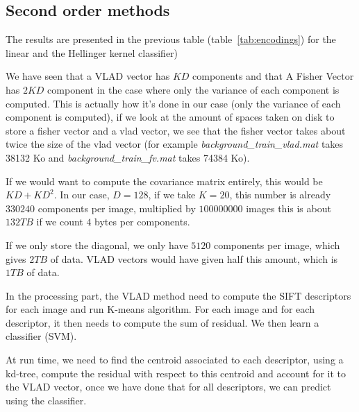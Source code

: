 \documentclass{article}
\begin{document}
\subsection{Second order methods}


The results are presented in the previous table
(table~\ref{tab:encodings}) for the linear and the Hellinger kernel
classifier)


We have seen that a VLAD vector has $K D$ components and that A Fisher
Vector has $2 K D$ component in the case where only the variance of
each component is computed. This is actually how it's done in our case
(only the variance of each component is computed), if we look at the
amount of spaces taken on disk to store a fisher vector and a vlad
vector, we see that the fisher vector takes about twice the size of
the vlad vector (for example \emph{background\_train\_vlad.mat} takes
38132 Ko and \emph{background\_train\_fv.mat} takes 74384 Ko).

If we would want to compute the covariance matrix entirely, this would
be $K D + K D^2$. In our case, $D = 128$, if we take $K = 20$, this
number is already $330240$ components per image, multiplied by
$100 000 000$ images this is about $132TB$ if we count $4$ bytes per
components.

If we only store the diagonal, we only have $5120$ components per
image, which gives $2TB$ of data. VLAD vectors would have given half
this amount, which is $1TB$ of data.

In the processing part, the VLAD method need to compute the SIFT
descriptors for each image and run K-means algorithm. For each image
and for each descriptor, it then needs to compute the sum of
residual. We then learn a classifier (SVM).

At run time, we need to find the centroid associated to each
descriptor, using a kd-tree, compute the residual with respect to this
centroid and account for it to the VLAD vector, once we have done that
for all descriptors, we can predict using the classifier.
\end{document}

